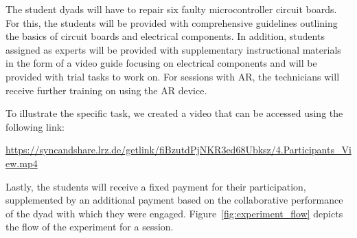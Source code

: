 \documentclass[A4,11pt]{article}
\begin{document}
The student dyads will have to repair six faulty microcontroller circuit boards. For this, the students will be provided with comprehensive guidelines outlining the basics of circuit boards and electrical components. In addition, students assigned as experts will be provided with supplementary instructional materials in the form of a video guide focusing on electrical components and will be provided with trial tasks to work on. For sessions with AR, the technicians will receive further training on using the AR device.

To illustrate the specific task, we created a video that can be accessed using the following link:

\url{https://syncandshare.lrz.de/getlink/fiBzutdPjNKR3ed68Ubksz/4.Participants_View.mp4}

Lastly, the students will receive a fixed payment for their participation, supplemented by an additional payment based on the collaborative performance of the dyad with which they were engaged. Figure~\ref{fig:experiment_flow} depicts the flow of the experiment for a session.
\end{document}
